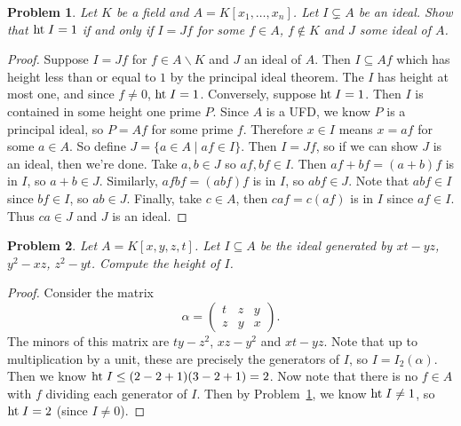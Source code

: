 \documentclass{article}
\newcommand{\Ht}{\textup{ht}\;}
\newtheorem{problem}{Problem}
\begin{document}
\begin{problem}
\label{oneprime}
Let $K$ be a field and $A = K[x_1, \dots , x_n]$. Let $I \subsetneq A$ be an ideal. Show that $\Ht I = 1$ if and only if $I = Jf$ for some $f \in A$, $f \notin K$ and $J$ some ideal of $A$.
\end{problem}
\begin{proof}
Suppose $I = Jf$ for $f \in A \backslash K$ and $J$ an ideal of $A$. Then $I \subseteq Af$ which has height less than or equal to $1$ by the principal ideal theorem. The $I$ has height at most one, and since $f \neq 0$, $\Ht I = 1$. Conversely, suppose $\Ht I = 1$. Then $I$ is contained in some height one prime $P$. Since $A$ is a UFD, we know $P$ is a principal ideal, so $P = Af$ for some prime $f$. Therefore $x \in I$ means $x = af$ for some $a \in A$. So define $J = \{a \in A \mid af \in I\}$. Then $I = Jf$, so if we can show $J$ is an ideal, then we're done. Take $a, b \in J$ so $af, bf \in I$. Then $af + bf = (a+b)f$ is in $I$, so $a + b \in J$. Similarly, $afbf = (abf)f$ is in $I$, so $abf \in J$. Note that $abf \in I$ since $bf \in I$, so $ab \in J$. Finally, take $c \in A$, then $caf = c(af)$ is in $I$ since $af \in I$. Thus $ca \in J$ and $J$ is an ideal.
\end{proof}

\begin{problem}
Let $A = K[x,y,z,t]$. Let $I \subseteq A$ be the ideal generated by $xt-yz$, $y^2-xz$, $z^2-yt$. Compute the height of $I$.
\end{problem}
\begin{proof}
Consider the matrix
\[
\alpha =
\left (
\begin{array}{ccc}
t & z & y\\
z & y & x
\end{array}
\right ).
\]
The minors of this matrix are $ty - z^2$, $xz - y^2$ and $xt-yz$. Note that up to multiplication by a unit, these are precisely the generators of $I$, so $I = I_2(\alpha)$. Then we know $\Ht I \leq (2 - 2 + 1)(3 - 2 + 1) = 2$. Now note that there is no $f \in A$ with $f$ dividing each generator of $I$. Then by Problem~\ref{oneprime}, we know $\Ht I \neq 1$, so $\Ht I = 2$ (since $I \neq 0$).
\end{proof}
\end{document}
